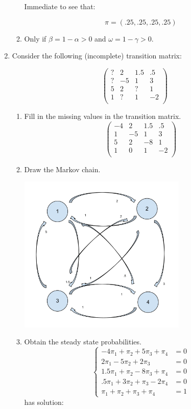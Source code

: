 \documentclass[12pt]{article}
\begin{document}
\begin{enumerate}
\begin{enumerate}
Immediate to see that:

$$\pi=(.25,.25,.25,.25)$$

\item

Only if $\beta=1-\alpha>0$ and $\omega=1-\gamma>0$.

\end{enumerate}

\item Consider the following (incomplete) transition matrix:

$$
\begin{pmatrix}
?&2&1.5&.5\\
?&-5&1&3\\
5&2&?&1\\
1&?&1&-2\\
\end{pmatrix}
$$
\begin{enumerate}
	\item Fill in the missing values in the transition matrix.
$$
\begin{pmatrix}
-4&2&1.5&.5\\
1&-5&1&3\\
5&2&-8&1\\
1&0&1&-2\\
\end{pmatrix}
$$
	\item Draw the Markov chain.

\begin{center}
\includegraphics[width=8cm]{Markov_Chains_Ex_3.pdf}
\end{center}

	\item Obtain the steady state probabilities.
$$ \begin{cases}
-4\pi_1+\pi_2+5\pi_3+\pi_4&=0\\
2\pi_1-5\pi_2+2\pi_3&=0\\
1.5\pi_1+\pi_2-8\pi_3+\pi_4&=0\\
.5\pi_1+3\pi_2+\pi_3-2\pi_4&=0\\
\pi_1+\pi_2+\pi_3+\pi_4&=1
\end{cases}$$
has solution:


\end{enumerate}
\end{enumerate}
\end{document}
